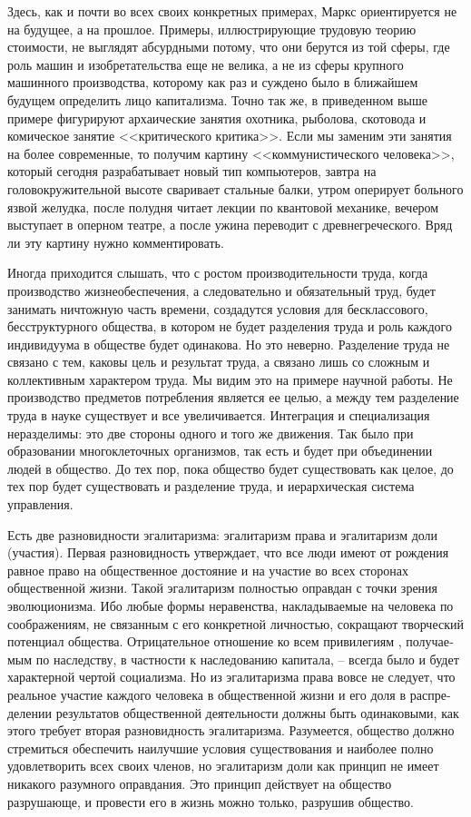 \documentclass{book}
\begin{document}
Здесь, как и почти во всех своих конкретных примерах, Маркс ориентируется не на будущее, а на прошлое. Примеры, иллюстрирующие трудовую теорию стоимости, не выглядят абсурдными потому, что они берутся из той сферы, где роль машин и изобретательства еще не велика, а не из сферы круп­ного машинного производства, которому как раз и суждено было в ближайшем будущем определить лицо капитализма. Точно так же, в приведенном выше примере фигурируют арха­ические занятия охотника, рыболова, скотовода и комиче­ское занятие <<критического критика>>. Если мы заменим эти занятия на более современные, то получим картину <<коммуни­стического человека>>, который сегодня разрабатывает новый тип компьютеров, завтра на головокружительной высоте сва­ривает стальные балки, утром оперирует больного язвой же­лудка, после полудня читает лекции по квантовой механике, вечером выступает в оперном театре, а после ужина переводит с древнегреческого. Вряд ли эту картину нужно комментиро­вать.

Иногда приходится слышать, что с ростом производитель­ности труда, когда производство жизнеобеспечения, а следо­вательно и обязательный труд, будет занимать ничтожную часть времени, создадутся условия для бесклассового, бесструктур­ного общества, в котором не будет разделения труда и роль каждого индивидуума в обществе будет одинакова. Но это не­верно. Разделение труда не связано с тем, каковы цель и ре­зультат труда, а связано лишь со сложным и коллективным характером труда. Мы видим это на примере научной работы. Не производство предметов потребления является ее целью, а между тем разделение труда в науке существует и все увели­чивается. Интеграция и специализация неразделимы: это две стороны одного и того же движения. Так было при образова­нии многоклеточных организмов, так есть и будет при объе­динении людей в общество. До тех пор, пока общество будет существовать как целое, до тех пор будет существовать и раз­деление труда, и иерархическая система управления.

Есть две разновидности эгалитаризма: эгалитаризм права и эгалитаризм доли (участия). Первая разновидность утверж­дает, что все люди имеют от рождения равное право на общест­венное достояние и на участие во всех сторонах общественной жизни. Такой эгалитаризм полностью оправдан с точки зрения эволюционизма. Ибо любые формы неравенства, накладывае­мые на человека по соображениям, не связанным с его кон­кретной личностью, сокращают творческий потенциал общест­ва. Отрицательное отношение ко всем привилегиям , получае­мым по наследству, в частности к наследованию капитала, -- всегда было и будет характерной чертой социализма. Но из эгалитаризма права вовсе не следует, что реальное участие каждого человека в общественной жизни и его доля в распре­делении результатов общественной деятельности должны быть одинаковыми, как этого требует вторая разновидность эгали­таризма. Разумеется, общество должно стремиться обеспечить наилучшие условия существования и наиболее полно удов­летворить всех своих членов, но эгалитаризм 
доли как принцип не имеет никакого разумного оправдания. Это принцип дейст­вует на общество разрушающе, и провести его в жизнь можно только, разрушив общество.
\end{document}
